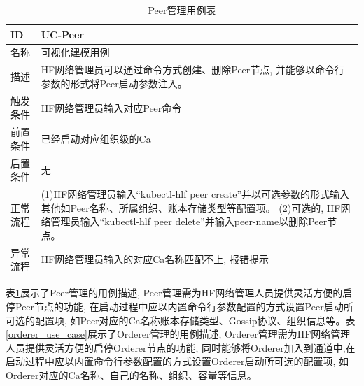 {\footnotesize
\begin{longtable}[h]{m{60pt}|m{280pt}}
    \caption[Peer管理用例表]{Peer管理用例表} \label{peer_use_case} \\
        \hline  
        ID&UC-Peer\\
        \hline
        名称&可视化建模用例\\
        \hline
        描述&HF网络管理员可以通过命令方式创建、删除Peer节点, 并能够以命令行参数的形式将Peer启动参数注入。\\
        \hline
        触发条件&HF网络管理员输入对应Peer命令\\
        \hline
        前置条件&已经启动对应组织级的Ca\\
        \hline
        后置条件&无\\
        \hline
        正常流程& (1)HF网络管理员输入“kubectl-hlf peer create”并以可选参数的形式输入其他如Peer名称、所属组织、账本存储类型等配置项。
        \newline (2)可选的, HF网络管理员输入“kubectl-hlf peer delete”并输入peer-name以删除Peer节点。\\
        \hline
        异常流程& HF网络管理员输入的对应Ca名称匹配不上, 报错提示\\
        \hline
    \end{longtable} 
}

表\ref{peer_use_case}展示了Peer管理的用例描述, Peer管理需为HF网络管理人员提供灵活方便的启停Peer节点的功能, 在启动过程中应以内置命令行参数配置的方式设置Peer启动所可选的配置项, 如Peer对应的Ca名称账本存储类型、Gossip协议、组织信息等。表\ref{orderer_use_case}展示了Orderer管理的用例描述, Orderer管理需为HF网络管理人员提供灵活方便的启停Orderer节点的功能, 同时能够将Orderer加入到通道中,在启动过程中应以内置命令行参数配置的方式设置Orderer启动所可选的配置项, 如Orderer对应的Ca名称、自己的名称、组织、容量等信息。


